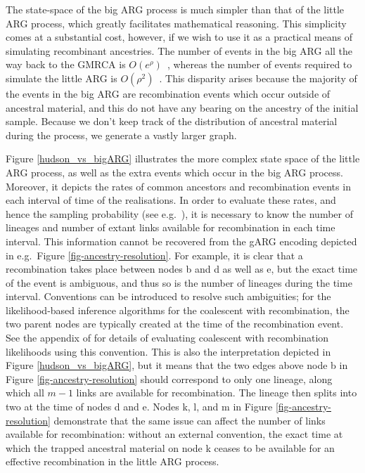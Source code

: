 \documentclass{article}
\begin{document}
The state-space of the big ARG process is much simpler than that of the little ARG process,
which greatly facilitates mathematical reasoning. This simplicity comes at a
substantial cost, however, if we wish to use it as a practical means of
simulating recombinant ancestries.
The number of events in the big ARG all the way back to the GMRCA
is $O(e^\rho)$~\citep{griffiths1997ancestral}, whereas the number
of events required to simulate the little ARG is
$O(\rho^2)$~\citep{hein2004gene,baumdicker2021efficient}.
This disparity arises because the majority of the events in the big ARG are
recombination events which occur outside of ancestral material,
and this do not have any bearing on the ancestry of the initial sample.
Because we don't keep track of the distribution of ancestral material during the process,
we generate a vastly larger graph.

Figure \ref{hudson_vs_bigARG} illustrates the more complex state space
of the little ARG process, as well as the extra events which occur in the big ARG process.
Moreover, it depicts the rates of common ancestors and recombination events in each
interval of time of the realisations.
In order to evaluate these rates, and hence the sampling probability
(see e.g.\ \cite[Equation (3)]{mahmoudi2022bayesian}),
it is necessary to know the number of lineages and number of extant links
available for recombination in each time interval.
This information cannot be recovered from the gARG encoding depicted in
e.g.\ Figure \ref{fig-ancestry-resolution}.
For example, it is clear that a recombination takes place between nodes \textsf{b} and
\textsf{d} as well as \textsf{e}, but the exact time of the event is ambiguous,
and thus so is the number of lineages during the time interval.
Conventions can be introduced to resolve such ambiguities;
for the likelihood-based inference algorithms for the coalescent with recombination,
the two parent nodes are typically created at the time of the recombination event.
See the appendix of \cite{baumdicker2021efficient} for details of evaluating
coalescent with recombination likelihoods using this convention.
This is also the interpretation depicted in
Figure \ref{hudson_vs_bigARG}, but it means that the two edges above node \textsf{b}
in Figure \ref{fig-ancestry-resolution} should correspond to only one lineage,
along which all $m-1$ links are available for recombination.
The lineage then splits into two at the time of nodes \textsf{d} and \textsf{e}.
Nodes \textsf{k}, \textsf{l}, and \textsf{m} in Figure \ref{fig-ancestry-resolution}
demonstrate that the same issue can affect the number of links available for recombination:
without an external convention, the exact time at which the trapped ancestral material on
node \textsf{k} ceases to be available for an effective recombination in the little ARG process.
\end{document}

